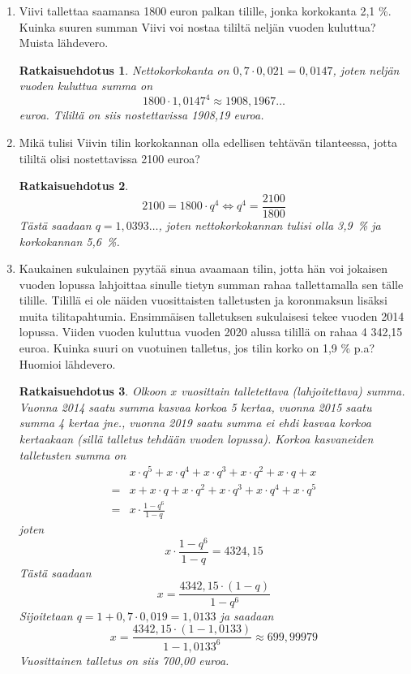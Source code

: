 \documentclass[a4paper,10pt,twoside]{article}
\newtheorem*{ratkaisu}{Ratkaisuehdotus}
\begin{document}
\begin{enumerate}
\item Viivi tallettaa saamansa 1800 euron palkan tilille, jonka korkokanta 2,1 \%. Kuinka suuren summan Viivi voi nostaa tililtä
neljän vuoden kuluttua? Muista lähdevero.
\begin{ratkaisu}
    Nettokorkokanta on \(0,7\cdot0,021 = 0,0147\),
    joten neljän vuoden kuluttua summa on
    \[
        1800\cdot1,0147^4\approx1908,1967\dots
    \]
    euroa. Tililtä on siis nostettavissa 1908,19 euroa.
\end{ratkaisu}

\item Mikä tulisi Viivin tilin korkokannan olla edellisen tehtävän tilanteessa, jotta tililtä olisi nostettavissa 2100 euroa?
\begin{ratkaisu}
    \[
        2100 = 1800\cdot q^4\Leftrightarrow q^4 = \frac{2100}{1800}
    \]
    Tästä saadaan \(q = 1,0393\dots\), joten nettokorkokannan tulisi olla 3,9~\% ja korkokannan 5,6~\%.
\end{ratkaisu}

\item Kaukainen sukulainen pyytää sinua avaamaan tilin, jotta hän voi jokaisen vuoden lopussa lahjoittaa sinulle tietyn
summan rahaa tallettamalla sen tälle tilille. Tilillä ei ole näiden vuosittaisten talletusten ja koronmaksun lisäksi muita tilitapahtumia.
Ensimmäisen talletuksen sukulaisesi tekee vuoden 2014 lopussa. Viiden vuoden kuluttua vuoden 2020 alussa tilillä on rahaa 4 342{,}15 euroa.
Kuinka suuri on vuotuinen talletus, jos tilin korko on 1{,}9 \% p.a? Huomioi lähdevero.
\begin{ratkaisu}
Olkoon \(x\) vuosittain talletettava (lahjoitettava) summa. Vuonna 2014 saatu summa kasvaa korkoa 5 kertaa,
vuonna 2015 saatu summa 4 kertaa jne., vuonna 2019 saatu summa ei ehdi kasvaa korkoa kertaakaan
(sillä talletus tehdään vuoden lopussa). Korkoa kasvaneiden talletusten summa on
\begin{align*}
    &x\cdot q^5 + x\cdot q^4+ x\cdot q^3 + x\cdot q^2+ x\cdot q + x \\
    =& x + x\cdot q+ x\cdot q^2 + x\cdot q^3+ x\cdot q^4 + x\cdot q^5\\
    =& x\cdot\frac{1-q^6}{1-q}
\end{align*}
joten
\[
   x\cdot\frac{1-q^6}{1-q} = 4324,15
\]
Tästä saadaan
\[
    x = \frac{4342,15\cdot(1-q)}{1-q^6}
\]
Sijoitetaan \(q= 1 + 0,7\cdot0,019=1,0133\) ja saadaan
\[
x = \frac{4342,15\cdot(1-1,0133)}{1-1,0133^6} \approx 699,99979
\]
Vuosittainen talletus on siis 700,00 euroa.
\end{ratkaisu}


\end{enumerate}
\end{document}
